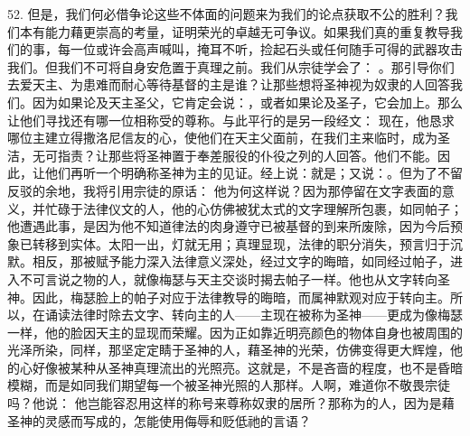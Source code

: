 52. 但是，我们何必借争论这些不体面的问题来为我们的论点获取不公的胜利？我们本有能力藉更崇高的考量，证明荣光的卓越无可争议。如果我们真的重复教导我们的事，每一位或许会高声喊叫，掩耳不听，捡起石头或任何随手可得的武器攻击我们。但我们不可将自身安危置于真理之前。我们从宗徒学会了： 。那引导你们去爱天主、为患难而耐心等待基督的主是谁？让那些想将圣神视为奴隶的人回答我们。因为如果论及天主圣父，它肯定会说：，或者如果论及圣子，它会加上。那么让他们寻找还有哪一位相称受的尊称。与此平行的是另一段经文：  现在，他恳求哪位主建立得撒洛尼信友的心，使他们在天主父面前，在我们主来临时，成为圣洁，无可指责？让那些将圣神置于奉差服役的仆役之列的人回答。他们不能。因此，让他们再听一个明确称圣神为主的见证。经上说：就是；又说：。但为了不留反驳的余地，我将引用宗徒的原话： 他为何这样说？因为那停留在文字表面的意义，并忙碌于法律仪文的人，他的心仿佛被犹太式的文字理解所包裹，如同帕子；他遭遇此事，是因为他不知道律法的肉身遵守已被基督的到来所废除，因为今后预象已转移到实体。太阳一出，灯就无用；真理显现，法律的职分消失，预言归于沉默。相反，那被赋予能力深入法律意义深处，经过文字的晦暗，如同经过帕子，进入不可言说之物的人，就像梅瑟与天主交谈时揭去帕子一样。他也从文字转向圣神。因此，梅瑟脸上的帕子对应于法律教导的晦暗，而属神默观对应于转向主。所以，在诵读法律时除去文字、转向主的人——主现在被称为圣神——更成为像梅瑟一样，他的脸因天主的显现而荣耀。因为正如靠近明亮颜色的物体自身也被周围的光泽所染，同样，那坚定定睛于圣神的人，藉圣神的光荣，仿佛变得更大辉煌，他的心好像被某种从圣神真理流出的光照亮。这就是，不是吝啬的程度，也不是昏暗模糊，而是如同我们期望每一个被圣神光照的人那样。人啊，难道你不敬畏宗徒吗？他说：  他岂能容忍用这样的称号来尊称奴隶的居所？那称为的人，因为是藉圣神的灵感而写成的，怎能使用侮辱和贬低祂的言语？ \par


